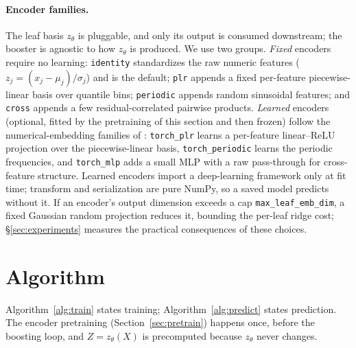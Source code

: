 \documentclass[11pt]{article}
\newcommand{\zt}{z_{\theta}}
\begin{document}
\paragraph{Encoder families.}
The leaf basis $\zt$ is pluggable, and only its output is consumed downstream; the
booster is agnostic to how $\zt$ is produced. We use two groups. \emph{Fixed} encoders
require no learning: \texttt{identity} standardizes the raw numeric features
($z_j = (x_j - \mu_j)/\sigma_j$) and is the default; \texttt{plr} appends a fixed
per-feature piecewise-linear basis over quantile bins; \texttt{periodic} appends
random sinusoidal features; and \texttt{cross} appends a few residual-correlated
pairwise products. \emph{Learned} encoders (optional, fitted by the pretraining of
this section and then frozen) follow the numerical-embedding families of
\citet{gorishniy2022embeddings}: \texttt{torch\_plr} learns a per-feature
linear--ReLU projection over the piecewise-linear basis, \texttt{torch\_periodic}
learns the periodic frequencies, and \texttt{torch\_mlp} adds a small MLP with a raw
pass-through for cross-feature structure. Learned encoders import a deep-learning
framework only at fit time; transform and serialization are pure NumPy, so a saved
model predicts without it. If an encoder's output dimension exceeds a cap
\texttt{max\_leaf\_emb\_dim}, a fixed Gaussian random projection reduces it, bounding
the per-leaf ridge cost; \S\ref{sec:experiments} measures the practical consequences
of these choices.

\section{Algorithm}
\label{sec:algorithm}

Algorithm~\ref{alg:train} states training; Algorithm~\ref{alg:predict} states
prediction. The encoder pretraining (Section~\ref{sec:pretrain}) happens once,
before the boosting loop, and $Z = \zt(X)$ is precomputed because $\zt$ never changes.
\end{document}
